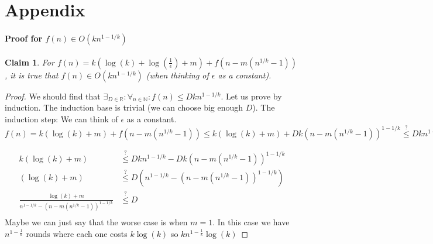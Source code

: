 \documentclass{article}
\theoremstyle{plain}
\newtheorem{claim}{Claim}
\begin{document}
\section{Appendix}
\paragraph{Proof for $f(n) \in O(kn^{1-1/k})$}
\begin{claim} 
For $f(n) = k(\log(k) + \log(\frac{1}{\epsilon}) + m) + f(n - m(n^{1/k} - 1))$, it is true that $f(n) \in O(kn^{1-1/k})$ (when thinking of $\epsilon$ as a constant). \newline
\end{claim}
\begin{proof}
We should find that $ \exists_{D\in\mathbb{R}} : \forall_{n \in \mathbb{N}} : f(n) \leq Dkn^{1-1/k}$. Let us prove by induction. The induction base is trivial (we can choose big enough $D$). The induction step: \newline
We can think of $\epsilon$ as a constant. \newline
$f(n) = k(\log(k) + m) + f(n - m(n^{1/k} - 1)) \leq k(\log(k) + m) + Dk(n - m(n^{1/k} - 1))^{1-1/k} \overset{?}{\leq} Dkn^{1-1/k}$ \newline

\begin{align*}
  k(\log(k) + m) &\overset{?}{\leq} Dkn^{1-1/k} -  Dk(n - m(n^{1/k} - 1))^{1-1/k}\\
  (\log(k) + m) &\overset{?}{\leq} D(n^{1-1/k} -  (n - m(n^{1/k} - 1))^{1-1/k})\\
  \frac{\log(k) + m}{n^{1-1/k} -  (n - m(n^{1/k} - 1))^{1-1/k}} & \overset{?}{\leq} D \\
\end{align*}
\newline
Maybe we can just say that the worse case is when $m = 1$.
In this case we have $n^{1-\frac{1}{k}}$ rounds where each one costs $k\log(k)$ so $kn^{1-\frac{1}{k}}\log(k)$
\end{proof}
\end{document}
